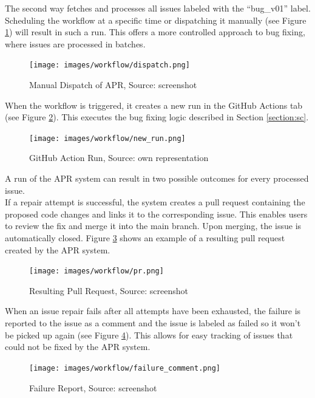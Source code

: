 The second way fetches and processes all issues labeled with the ``bug\_v01'' label. Scheduling the workflow at a specific time or dispatching it manually (see Figure \ref{fig:dispatch}) will result in such a run. This offers a more controlled approach to bug fixing, where issues are processed in batches.

\begin{figure}[H]
    \centering
    \texttt{[image: images/workflow/dispatch.png]}
    \caption{Manual Dispatch of APR, Source: screenshot}
    \label{fig:dispatch}
\end{figure}

When the workflow is triggered, it creates a new run in the GitHub Actions tab (see Figure \ref{fig:apr-action}). This executes the bug fixing logic described in Section \ref{section:sc}.


\begin{figure}[H]
    \centering
    \texttt{[image: images/workflow/new\_run.png]}
    \caption{GitHub Action Run, Source: own representation}
    \label{fig:apr-action}
\end{figure}

A run of the APR system can result in two possible outcomes for every processed issue. \\
If a repair attempt is successful, the system creates a pull request containing the proposed code changes and links it to the corresponding issue. This enables users to review the fix and merge it into the main branch. Upon merging, the issue is automatically closed.
Figure \ref{fig:pr} shows an example of a resulting pull request created by the APR system.

\begin{figure}[H]
    \centering
    \texttt{[image: images/workflow/pr.png]}
    \caption{Resulting Pull Request, Source: screenshot}
    \label{fig:pr}
\end{figure}

When an issue repair fails after all attempts have been exhausted, the failure is reported to the issue as a comment and the issue is labeled as failed so it won't be picked up again (see Figure \ref{fig:failure-report}). This allows for easy tracking of issues that could not be fixed by the APR system.

\begin{figure}[H]
    \centering
    \texttt{[image: images/workflow/failure\_comment.png]}
    \caption{Failure Report, Source: screenshot}
    \label{fig:failure-report}
\end{figure}

